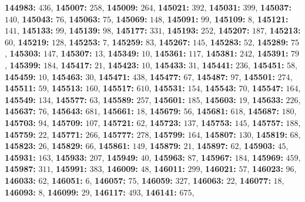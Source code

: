 \textsf{\bfseries 144983:} $436$, \textsf{\bfseries 145007:} $258$, \textsf{\bfseries 145009:} $264$, \textsf{\bfseries 145021:} $392$, \textsf{\bfseries 145031:} $399$, \textsf{\bfseries 145037:} $140$, \textsf{\bfseries 145043:} $76$, \textsf{\bfseries 145063:} $75$, \textsf{\bfseries 145069:} $148$, \textsf{\bfseries 145091:} $99$, \textsf{\bfseries 145109:} $8$, \textsf{\bfseries 145121:} $141$, \textsf{\bfseries 145133:} $99$, \textsf{\bfseries 145139:} $98$, \textsf{\bfseries 145177:} $331$, \textsf{\bfseries 145193:} $252$, \textsf{\bfseries 145207:} $187$, \textsf{\bfseries 145213:} $60$, \textsf{\bfseries 145219:} $128$, \textsf{\bfseries 145253:} $7$, \textsf{\bfseries 145259:} $83$, \textsf{\bfseries 145267:} $145$, \textsf{\bfseries 145283:} $52$, \textsf{\bfseries 145289:} $75$, \textsf{\bfseries 145303:} $147$, \textsf{\bfseries 145307:} $13$, \textsf{\bfseries 145349:} $10$, \textsf{\bfseries 145361:} $117$, \textsf{\bfseries 145381:} $242$, \textsf{\bfseries 145391:} $79$, \textsf{\bfseries 145399:} $184$, \textsf{\bfseries 145417:} $21$, \textsf{\bfseries 145423:} $10$, \textsf{\bfseries 145433:} $31$, \textsf{\bfseries 145441:} $236$, \textsf{\bfseries 145451:} $58$, \textsf{\bfseries 145459:} $10$, \textsf{\bfseries 145463:} $30$, \textsf{\bfseries 145471:} $438$, \textsf{\bfseries 145477:} $67$, \textsf{\bfseries 145487:} $97$, \textsf{\bfseries 145501:} $274$, \textsf{\bfseries 145511:} $59$, \textsf{\bfseries 145513:} $160$, \textsf{\bfseries 145517:} $610$, \textsf{\bfseries 145531:} $154$, \textsf{\bfseries 145543:} $70$, \textsf{\bfseries 145547:} $164$, \textsf{\bfseries 145549:} $134$, \textsf{\bfseries 145577:} $63$, \textsf{\bfseries 145589:} $257$, \textsf{\bfseries 145601:} $185$, \textsf{\bfseries 145603:} $19$, \textsf{\bfseries 145633:} $226$, \textsf{\bfseries 145637:} $76$, \textsf{\bfseries 145643:} $681$, \textsf{\bfseries 145661:} $18$, \textsf{\bfseries 145679:} $56$, \textsf{\bfseries 145681:} $618$, \textsf{\bfseries 145687:} $180$, \textsf{\bfseries 145703:} $94$, \textsf{\bfseries 145709:} $107$, \textsf{\bfseries 145721:} $62$, \textsf{\bfseries 145723:} $137$, \textsf{\bfseries 145753:} $145$, \textsf{\bfseries 145757:} $188$, \textsf{\bfseries 145759:} $22$, \textsf{\bfseries 145771:} $266$, \textsf{\bfseries 145777:} $278$, \textsf{\bfseries 145799:} $164$, \textsf{\bfseries 145807:} $130$, \textsf{\bfseries 145819:} $68$, \textsf{\bfseries 145823:} $26$, \textsf{\bfseries 145829:} $66$, \textsf{\bfseries 145861:} $149$, \textsf{\bfseries 145879:} $21$, \textsf{\bfseries 145897:} $62$, \textsf{\bfseries 145903:} $45$, \textsf{\bfseries 145931:} $163$, \textsf{\bfseries 145933:} $207$, \textsf{\bfseries 145949:} $40$, \textsf{\bfseries 145963:} $87$, \textsf{\bfseries 145967:} $184$, \textsf{\bfseries 145969:} $459$, \textsf{\bfseries 145987:} $311$, \textsf{\bfseries 145991:} $383$, \textsf{\bfseries 146009:} $48$, \textsf{\bfseries 146011:} $299$, \textsf{\bfseries 146021:} $57$, \textsf{\bfseries 146023:} $96$, \textsf{\bfseries 146033:} $62$, \textsf{\bfseries 146051:} $6$, \textsf{\bfseries 146057:} $75$, \textsf{\bfseries 146059:} $327$, \textsf{\bfseries 146063:} $22$, \textsf{\bfseries 146077:} $18$, \textsf{\bfseries 146093:} $8$, \textsf{\bfseries 146099:} $29$, \textsf{\bfseries 146117:} $493$, \textsf{\bfseries 146141:} $675$, 
